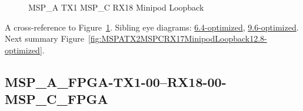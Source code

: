 \begin{figure}[h]
\begin{subfigure}{0.33\textwidth}
\hyperref[sec:MSPAFPGATX106RX1806MSPCFPGA12.8-optimized]{}
\end{subfigure}\hspace*{\fill}
\begin{subfigure}{0.33\textwidth}
\hyperref[sec:MSPAFPGATX107RX1807MSPCFPGA12.8-optimized]{}
\end{subfigure}\hspace*{\fill}
\begin{subfigure}{0.33\textwidth}
\hyperref[sec:MSPAFPGATX108RX1808MSPCFPGA12.8-optimized]{}
\end{subfigure}

\begin{subfigure}{0.33\textwidth}
\hyperref[sec:MSPAFPGATX109RX1809MSPCFPGA12.8-optimized]{}
\end{subfigure}\hspace*{\fill}
\begin{subfigure}{0.33\textwidth}
\hyperref[sec:MSPAFPGATX110RX1810MSPCFPGA12.8-optimized]{}
\end{subfigure}\hspace*{\fill}
\begin{subfigure}{0.33\textwidth}
\hyperref[sec:MSPAFPGATX111RX1811MSPCFPGA12.8-optimized]{}
\end{subfigure}

\caption{MSP\_A TX1 MSP\_C RX18 Minipod Loopback} \label{fig:MSPATX1MSPCRX18MinipodLoopback12.8-optimized}
\end{figure}

A cross-reference to Figure~\ref{fig:MSPATX1MSPCRX18MinipodLoopback12.8-optimized}.
Sibling eye diagrams: \hyperref[sec:MSPATX1MSPCRX18MinipodLoopback6.4-optimized]{6.4-optimized}, \hyperref[sec:MSPATX1MSPCRX18MinipodLoopback9.6-optimized]{9.6-optimized}. \\
Next summary Figure~\ref{fig:MSPATX2MSPCRX17MinipodLoopback12.8-optimized}.
\clearpage
% 
\subsection{MSP\_A\_FPGA-TX1-00--RX18-00-MSP\_C\_FPGA}\label{sec:MSPAFPGATX100RX1800MSPCFPGA12.8-optimized}

